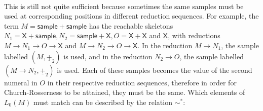 \documentclass{article}
\newcommand{\tsample}{\mathsf{sample}}
\newcommand{\skeletonPlaceholder}{\mathsf{X}} %
\theoremstyle{definition}
\theoremstyle{lemma}
\theoremstyle{remark}
\begin{document}
\paragraph{}
This is still not quite sufficient because sometimes the same samples must be used at corresponding positions in different reduction sequences. For example, the term $M = \tsample + \tsample$ has the reachable skeletons $N_1 = \skeletonPlaceholder + \tsample, N_2 = \tsample + \skeletonPlaceholder, O = \skeletonPlaceholder + \skeletonPlaceholder$ and $\skeletonPlaceholder$, with reductions $M \to N_1 \to O \to \skeletonPlaceholder$ and $M \to N_2 \to O \to \skeletonPlaceholder$. In the reduction $M \to N_1$, the sample labelled $(M, \underline{+}_2)$ is used, and in the reduction $N_2 \to O$, the sample labelled $(M \to N_2, \underline{+}_2)$ is used. Each of these samples becomes the value of the second numeral in $O$ in their respective reduction sequences, therefore in order for Church-Rosserness to be attained, they must be the same. Which elements of $L_0(M)$ must match can be described by the relation $\sim^*$:
\end{document}
